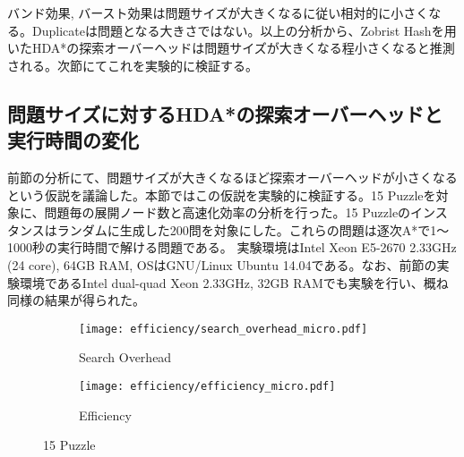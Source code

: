 \documentclass[uplatex]{jsarticle}
\begin{document}
バンド効果, バースト効果は問題サイズが大きくなるに従い相対的に小さくなる。Duplicateは問題となる大きさではない。以上の分析から、Zobrist Hashを用いたHDA*の探索オーバーヘッドは問題サイズが大きくなる程小さくなると推測される。次節にてこれを実験的に検証する。


\subsection{問題サイズに対するHDA*の探索オーバーヘッドと実行時間の変化}
\label{sec:speedup_size}
前節の分析にて、問題サイズが大きくなるほど探索オーバーヘッドが小さくなるという仮説を議論した。本節ではこの仮説を実験的に検証する。15 Puzzleを対象に、問題毎の展開ノード数と高速化効率の分析を行った。15 Puzzleのインスタンスはランダムに生成した200問を対象にした。これらの問題は逐次A*で1～1000秒の実行時間で解ける問題である。%
実験環境はIntel Xeon E5-2670 2.33GHz (24 core), 64GB RAM, OSはGNU/Linux Ubuntu 14.04である。なお、前節の実験環境であるIntel dual-quad Xeon 2.33GHz, 32GB RAMでも実験を行い、概ね同様の結果が得られた。
\newline

\begin{figure}[h]
	\centering
	\begin{subfigure}{0.45\columnwidth}
		\texttt{[image: efficiency/search\_overhead\_micro.pdf]}	
		\caption{Search Overhead}
		\label{fig:david_so}
	\end{subfigure}
	\begin{subfigure}{0.45\columnwidth}
		\texttt{[image: efficiency/efficiency\_micro.pdf]}	
		\caption{Efficiency}
		\label{fig:david_speedup}
	\end{subfigure}
	\caption{15 Puzzle}
	\label{fig:15_david}
\end{figure}

\begin{comment}
\begin{figure}[h]
	\centering
	\begin{subfigure}{0.45\columnwidth}
		\texttt{[image: efficiency/search\_overhead\_24puzzle\_micro.pdf]}	
		\caption{Search Overhead}
		\label{fig:david_so_24}
	\end{subfigure}
	\begin{subfigure}{0.45\columnwidth}
		\texttt{[image: efficiency/efficiency\_24puzzle\_micro.pdf]}	
		\caption{Efficiency}
		\label{fig:david_speedup_24}
	\end{subfigure}
	\caption{24 Puzzle}
	\label{fig:24_david}
\end{figure}
\end{comment}
\end{document}
